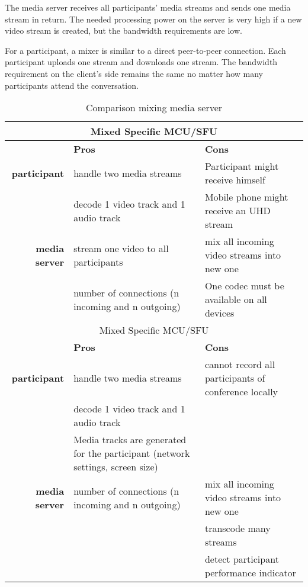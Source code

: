 \documentclass[../../../thesis.tex]{subfiles}
\begin{document}
\noindent
The media server receives all participants' media streams and sends one media stream in return. The needed processing power on the server is very high if a new video stream is created, but the bandwidth requirements are low.\par
For a participant, a mixer is similar to a direct peer-to-peer connection. Each participant uploads one stream and downloads one stream. The bandwidth requirement on the client's side remains the same no matter how many participants attend the conversation.\\

\clearpage
\begin{table}[h]
\caption{Comparison mixing media server}
\centering
\begin{tabular}{ r p{6cm} p{6cm} }
	\hline
	\multicolumn{3}{|c|}{Mixed Specific MCU/SFU} \\
	\hline
	& \textbf{Pros} & \textbf{Cons} \\
	\cline{2-3}
	\textbf{participant} & handle two media streams & Participant might receive himself \\ 
	& decode 1 video track and 1 audio track & Mobile phone might receive an UHD stream\\
	\cline{2-3}
	\textbf{media server} & stream one video to all participants & mix all incoming video streams into new one\\
	& number of connections (n incoming and n outgoing) & One codec must be available on all devices\\[1.4em]
	\hline
	\multicolumn{3}{|c|}{Mixed Specific MCU/SFU} \\
	\hline
	& \textbf{Pros} & \textbf{Cons} \\
	\cline{2-3}
	\textbf{participant} & handle two media streams & cannot record all participants of conference locally \\ 
	& decode 1 video track and 1 audio track & \\
	& Media tracks are generated for the participant (network settings, screen size) & \\
	\cline{2-3}
	\textbf{media server} & number of connections (n incoming and n outgoing) & mix all incoming video streams into new one\\
	& & transcode many streams\footnotemark \\
	& & detect participant performance indicator\footnotemark\\
\end{tabular}
\end{table}


\clearpage
\end{document}
